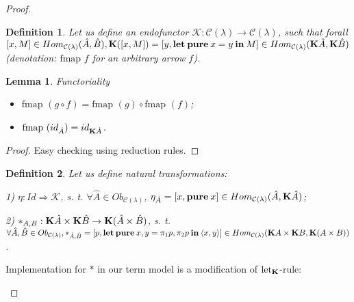 \documentclass[a4paper]{article}
\newtheorem{lemma}{Lemma}
\newtheorem{defin}{Definition}
\begin{document}
\begin{proof}
\begin{defin}
  Let us define an endofunctor $\mathcal{K} : \mathcal{C}(\lambda) \to \mathcal{C}(\lambda)$, such that
forall $[x,M] \in Hom_{\mathcal{C}(\lambda)}(\hat{A},\hat{B}), {\bf K}([x,M]) = [y, {\bf let \: pure \:} x = y {\: \bf in \:} M] \in Hom_{\mathcal{C}(\lambda)}({\bf K} \hat{A}, {\bf K} \hat{B})$ (denotation: $\text{fmap } f$ for an arbitrary arrow $f$).

\end{defin}

\begin{lemma} Functoriality

\begin{itemize}
  \item $\text{fmap }(g \circ f) = \text{fmap }(g) \circ \text{fmap }(f)$;
  \item $\text{fmap }(id_{\hat{A}}) = id_{{\bf K}\hat{A}}$.
\end{itemize}
\end{lemma}

\begin{proof}

Easy checking using reduction rules.

\end{proof}

\begin{defin}

  Let us define natural transformations:

  1) $\eta:Id \Rightarrow \mathcal{K}$, s. t. $\forall \hat{A} \in Ob_{\mathcal{C}(\lambda)}$, $\eta_{\hat{A}} = [x, {\bf pure \:} x] \in Hom_{\mathcal{C}(\lambda)}(\hat{A}, {\bf K}\hat{A})$;

  2) $\ast_{A,B}:{\bf K}\hat{A} \times {\bf K}\hat{B} \to {\bf K}(\hat{A} \times \hat{B})$, s. t. $\forall \hat{A}, \hat{B} \in Ob_{\mathcal{C}(\lambda)}, \ast_{\hat{A},\hat{B}} = [p, {\bf let \: pure \:} x,y = \pi_1 p, \pi_2 p {\: \bf in \:} \langle x, y \rangle] \in Hom_{\mathcal{C}(\lambda)}({\bf K}A \times {\bf K}B, {\bf K}(A \times B))$.
\end{defin}

Implementation for $\ast$ in our term model is a modification of ${\text{let}_{\bf K}}$-rule:

\begin{prooftree}
\end{prooftree}


\end{proof}
\end{document}
